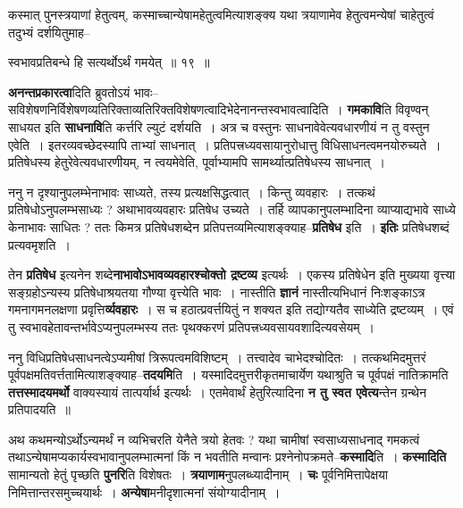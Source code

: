\documentclass[article,12pt,a4paper]{memoir}
\begin{document}
	  \pstart कस्मात् पुनस्त्रयाणां हेतुत्वम्, कस्माच्चान्येषामहेतुत्वमित्याशङ्क्य यथा त्रयाणामेव हेतुत्वमन्येषां चाहेतुत्वं तदुभ्यं दर्शयितुमाह--
	\pend
      
	  \endgroup
	
	  \bigskip
	  \begingroup
	

	  \pstart स्वभावप्रतिबन्धे हि सत्यर्थोऽर्थं गमयेत् ॥ १९ ॥
	\pend
      
	  \endgroup
	

	  \pstart \textbf{अनन्तप्रकारत्वा}दिति ब्रुवतोऽयं भावः--सविशेषणनिर्विशेषणव्यतिरिक्ताव्यतिरिक्तविशेषणत्वादिभेदेनानन्तस्वभावत्वादिति । \textbf{गमकावि}ति विवृण्वन् साधयत इति \textbf{साधनावि}ति कर्त्तरि ल्युटं दर्शयति । अत्र च वस्तुनः साधनावेवेत्यवधारणीयं न तु वस्तुन एवेति । इतरव्यवच्छेदस्यापि ताभ्यां साधनात् । प्रतिपत्त्रध्यवसायानुरोधात्तु विधिसाधनत्वमनयोरुच्यते । प्रतिषेधस्य हेतुरेवेत्यवधारणीयम्, न त्वयमेवेति, पूर्वाभ्यामपि सामर्थ्यात्प्रतिषेधस्य साधनात् ।
	\pend
      

	  \pstart ननु न दृश्यानुपलम्भेनाभावः साध्यते, तस्य प्रत्यक्षसिद्धत्वात् । किन्तु व्यवहारः । तत्कथं प्रतिषेधोऽनुपलम्भसाध्यः ? अथाभावव्यवहारः प्रतिषेध उच्यते । तर्हि व्यापकानुपलम्भादिना व्याप्याद्यभावे साध्ये केनाभावः साधितः ? ततः किमत्र प्रतिषेधशब्देन प्रतिपत्तव्यमित्याशङ्क्याह--\textbf{प्रतिषेध} इति । \textbf{इतिः} प्रतिषेधशब्दं प्रत्यवमृशति ।
	\pend
      

	  \pstart तेन \textbf{प्रतिषेध} इत्यनेन शब्दे\textbf{नाभावोऽभावव्यवहारश्चोक्तो द्रष्टव्य} इत्यर्थः । एकस्य प्रतिषेधेन इति मुख्यया वृत्त्या सङ्ग्रहोऽन्यस्य प्रतिषेधाश्रयतया गौण्या वृत्त्येति भावः । नास्तीति \textbf{ज्ञानं} नास्तीत्यभिधानं निःशङ्काऽत्र गमनागमनलक्षणा प्रवृत्ति\textbf{र्व्यवहारः} । स च हठात्प्रवर्त्तयितुं न शक्यत इति तद्योग्यतैव साध्येति द्रष्टव्यम् । एवं तु स्वभावहेतावन्तर्भावेऽप्यनुपलम्भस्य ततः पृथक्करणं प्रतिपत्त्रध्यवसायवशादित्यवसेयम् ।
	\pend
      

	  \pstart ननु विधिप्रतिषेधसाधनत्वेऽप्यमीषां त्रिरूपत्वमविशिष्टम् । तत्त्वादेव चाभेदश्चोदितः । तत्कथमिदमुत्तरं पूर्वपक्षमतिवर्त्ततामित्याशङ्क्याह--\textbf{तदयमि}ति । यस्मादिदमुत्तरीकृतमाचार्येण यथाश्रुति च पूर्वपक्षं नातिक्रामति \textbf{तत्तस्मादयमर्थो} वाक्यस्यायं तात्पर्यार्थ इत्यर्थः । एतमेवार्थं हेतुरित्यादिना \textbf{न तु स्वत एवेत्य}न्तेन ग्रन्थेन प्रतिपादयति ॥
	\pend
      

	  \pstart अथ कथमन्योऽर्थोऽन्यमर्थं न व्यभिचरति येनैते त्रयो हेतवः ? य\leavevmode{}था चामीषां स्वसाध्यसाधनाद् गमकत्वं तथाऽन्येषामप्यकार्यस्वभावानुपलम्भात्मनां किं न भवतीति मन्वानः प्रश्नेनोपक्रमते--\textbf{कस्मादि}ति । \textbf{कस्मादिति} सामान्यतो हेतुं पृच्छति \textbf{पुनरि}ति विशेषतः । \textbf{त्रयाणाम}नुपलब्ध्यादीनाम् । \textbf{चः} पूर्वनिमित्तापेक्षया निमित्तान्तरसमुच्चयार्थः । \textbf{अन्येषा}मनीदृशात्मनां संयोग्यादीनाम् ।
	\pend
	  \bigskip
	  \begingroup
	
\end{document}
